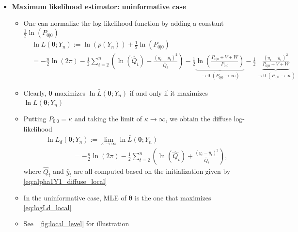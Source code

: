\documentclass[12pt,a4paper]{article}
\begin{document}
\begin{itemize}
\begin{itemize}
  \end{itemize}

\item \textbf{Maximum likelihood estimator: uninformative case}

  \begin{itemize}

  \item One can normalize the log-likelihood function by adding a
    constant $\frac{1}{2}\ln(P_{0|0})$
    \begin{align}
      &\ln \bar{L}(\bm{\theta};Y_{n})
        := \ln \left(p(Y_{n})\right) + \frac{1}{2}\ln(P_{0|0})  \nonumber \\
      & = - \frac{n}{2}\ln(2\pi) - \frac{1}{2}\sum_{t=2}^{n}\left(\ln(\hat{Q}_{t}) + \frac{(y_{t}-\hat{y}_{t})^{2}}{\hat{Q}_{t}}\right)
        -\frac{1}{2}\underbrace{\ln \left( \frac{P_{0|0}+V+W}{P_{0|0}}\right)}_{\to 0 \,\,(P_{0|0}\to\infty)} -\frac{1}{2}\underbrace{\frac{(y_{1}-\hat{y}_{1})^{2}}{P_{0|0}+V+W}}_{\to 0 \,\,(P_{0|0}\to\infty)}
        \nonumber%
    \end{align}

  \item Clearly, $\bm{\theta}$ maximizes $\ln \bar{L}(\bm{\theta};Y_{n})$ if and
    only if it maximizes $\ln L(\bm{\theta};Y_{n})$

  \item Putting $P_{0|0}=\kappa$ and taking the limit of
    $\kappa\to\infty$, we obtain the diffuse log-likelihood
    \begin{align}
      &\ln L_{d}(\bm{\theta};Y_{n})
        := \lim_{\kappa\to\infty}\ln \bar{L}(\bm{\theta};Y_{n})  \nonumber \\
      & \qquad \qquad = - \frac{n}{2}\ln(2\pi)  - \frac{1}{2}\sum_{t=2}^{n}\left(\ln \left(\hat{Q}_{t}\right) + \frac{(y_{t}-\hat{y}_{t})^{2}}{\hat{Q}_{t}}\right),
        \label{eq:logLd_local}%
    \end{align}
    where $\hat{Q}_{t}$ and
    $\hat{y}_{t}$ are all computed based on the initialization given by \eqref{eq:alpha1Y1_diffuse_local}
  \item In the uninformative case, MLE of $\bm{\theta}$ is the one that
    maximizes \eqref{eq:logLd_local}
  \item See \figurename~\ref{fig:local_level} for illustration
  
  \end{itemize}


\end{itemize}
\end{document}

